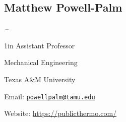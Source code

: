 \documentclass[11pt]{article}
\newcommand{\sectionwidth}{1in}		%
\newcommand{\subsectionskip}{\baselineskip}	%
\newcommand{\cvdates}[2]{\hfill#1\,--\,#2}	%
\begin{document}
	\vspace*{\subsectionskip}

	\subsection{Matthew Powell-Palm}
	\cvdates{}{}

	\begin{adjustwidth}{\sectionwidth}{}
	Assistant Professor

	Mechanical Engineering

	Texas A\&M University

	Email: \href{mailto:powellpalm@tamu.edu}{\texttt{powellpalm@tamu.edu}}

	Website: \url{https://publicthermo.com/}
	\end{adjustwidth}
	
\end{document}

